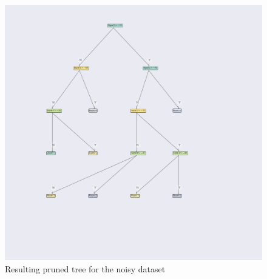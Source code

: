 \begin{figure}[H]
    \centering
    \includegraphics[width=\textwidth]{figures/noisy_pruned.pdf}
    \caption[Pruned Tree for the Noisy Dataset]{Resulting pruned tree for the noisy dataset}
      \label{fig:pruning_example_noisy_pruned}
\end{figure}
\newpage
